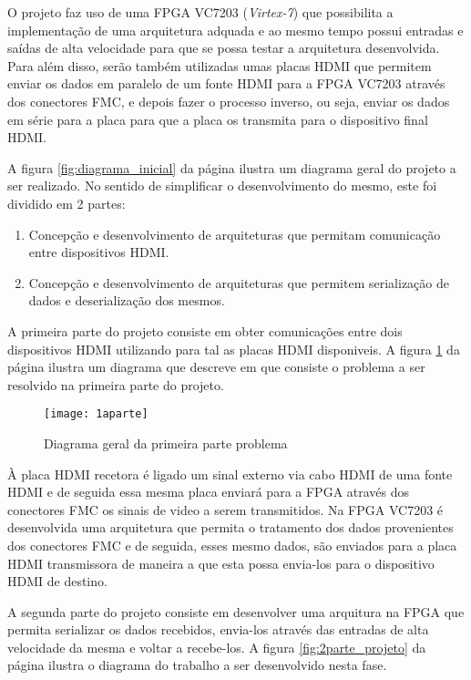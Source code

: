 O projeto faz uso de uma FPGA VC7203 (\textit{Virtex-7}) que possibilita a implementação de uma arquitetura adquada e ao mesmo tempo possui entradas e saídas de alta velocidade para que se possa testar a arquitetura desenvolvida. Para além disso, serão também utilizadas umas placas HDMI que permitem enviar os dados em paralelo de um fonte HDMI para a FPGA VC7203 através dos conectores FMC, e depois fazer o processo inverso, ou seja, enviar os dados em série para a placa para que a placa os transmita para o dispositivo final HDMI.

A figura \ref{fig:diagrama_inicial} da página \pageref{fig:diagrama_inicial} ilustra um diagrama geral do projeto a ser realizado. No sentido de simplificar o desenvolvimento do mesmo, este foi dividido em 2 partes:
\begin{enumerate}
	\item Concepção e desenvolvimento de arquiteturas que permitam comunicação entre dispositivos HDMI.
	\item Concepção e desenvolvimento de arquiteturas que permitem serialização de dados e deserialização dos mesmos.
\end{enumerate}

A primeira parte do projeto consiste em obter comunicações entre dois dispositivos HDMI utilizando para tal as placas HDMI disponiveis. A figura \ref{fig:1parte_projeto} da página \pageref{fig:1parte_projeto} ilustra um diagrama que descreve em que consiste o problema a ser resolvido na primeira parte do projeto.
\begin{figure}[h!]
	\begin{center}
		\leavevmode
		\texttt{[image: 1aparte]}
		\caption{Diagrama geral da primeira parte problema}
		\label{fig:1parte_projeto}
	\end{center}
\end{figure}

À placa HDMI recetora é ligado um sinal externo via cabo HDMI de uma fonte HDMI e de seguida essa mesma placa enviará para a FPGA através dos conectores FMC os sinais de video a serem transmitidos. Na FPGA VC7203 é desenvolvida uma arquitetura que permita o tratamento dos dados provenientes dos conectores FMC e de seguida, esses mesmo dados, são enviados para a placa HDMI transmissora de maneira a que esta possa envia-los para o dispositivo HDMI de destino.

A segunda parte do projeto consiste em desenvolver uma arquitura na FPGA que permita serializar os dados recebidos, envia-los através das entradas de alta velocidade da mesma e voltar a recebe-los. A figura \ref{fig:2parte_projeto} da página \pageref{fig:2parte_projeto} ilustra o diagrama do trabalho a ser desenvolvido nesta fase.

